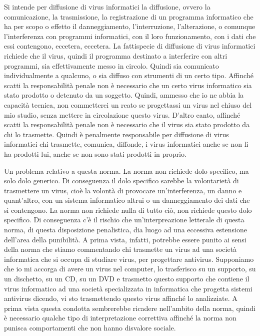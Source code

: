 Si intende per diffusione di virus informatici la diffusione, ovvero la comunicazione, la trasmissione, la registrazione di un programma informatico che ha per scopo o effetto il danneggiamento, l'interruzione, l'alterazione, o comunque l'interferenza con programmi informatici, con il loro funzionamento, con i dati che essi contengono, eccetera, eccetera. 
La fattispecie di diffusione di virus informatici richiede che il virus, quindi il programma destinato a interferire con altri programmi, sia effettivamente messo in circolo. Quindi sia comunicato individualmente a qualcuno, o sia diffuso con strumenti di un certo tipo. 
Affinché scatti la responsabilità penale non è necessario che un certo virus informatico sia stato prodotto o detenuto da un soggetto. Quindi, ammesso che io ne abbia la capacità tecnica, non commetterei un reato se progettassi un virus nel chiuso del mio studio, senza mettere in circolazione questo virus. D'altro canto, affinché scatti la responsabilità penale non è necessario che il virus sia stato prodotto da chi lo trasmette. 
Quindi è penalmente responsabile per diffusione di virus informatici chi trasmette, comunica, diffonde, i virus informatici anche se non li ha prodotti lui, anche se non sono stati prodotti in proprio. 

Un problema relativo a questa norma. La norma non richiede dolo specifico, ma solo dolo generico. Di conseguenza il dolo specifico sarebbe la volontarietà di trasmettere un virus, cioè la volontà di provocare un'interferenza, un danno e quant'altro, con un sistema informatico altrui o un danneggiamento dei dati che si contengono. La norma non richiede nulla di tutto ciò, non richiede questo dolo specifico. Di conseguenza c'è il rischio che un'interpreazione letterale di questa norma, di questa disposizione penalistica, dia luogo ad una eccessiva estensione dell'area della punibilità. A prima vista, infatti, potrebbe essere punito ai sensi della norma che stiamo commentando chi trasmette un virus ad una società informatica che si occupa di studiare virus, per progettare antivirus. Supponiamo che io mi accorga di avere un virus nel computer, lo trasferisco su un supporto, su un dischetto, su un CD, su un DVD  e trasmetto questo supporto che contiene il virus informatico ad una società specializzata in informatica che progetta sistemi antivirus dicendo, vi sto trasmettendo questo virus affinché lo analizziate. A prima vista questa condotta sembrerebbe ricadere nell'ambito della norma, quindi è necessario qualche tipo di interpretazione correttiva affinché la norma non punisca comportamenti che non hanno disvalore sociale. 

